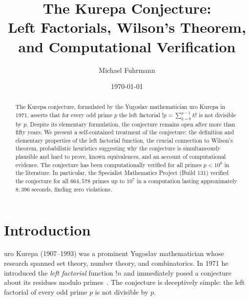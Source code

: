 \documentclass[12pt,a4paper]{amsart}
\theoremstyle{definition}
\begin{document}

\title{The Kurepa Conjecture:\\
       Left Factorials, Wilson's Theorem,\\
       and Computational Verification}

\author{Michael Fuhrmann}
\address{Specialist Mathematics Project, Build 133}
\date{\today}

\begin{abstract}
The Kurepa conjecture, formulated by the Yugoslav mathematician \DJ{}uro Kurepa
in 1971, asserts that for every odd prime $p$ the left factorial
$!p = \sum_{k=0}^{p-1} k!$ is not divisible by $p$.
Despite its elementary formulation, the conjecture remains open after more than
fifty years.
We present a self-contained treatment of the conjecture: the definition and
elementary properties of the left factorial function, the crucial connection to
Wilson's theorem, probabilistic heuristics suggesting why the conjecture is
simultaneously plausible and hard to prove, known equivalences, and an account
of computational evidence.
The conjecture has been computationally verified for all primes $p < 10^8$
in the literature.
In particular, the Specialist Mathematics Project (Build 131) verified the
conjecture for all $664{,}578$ primes up to $10^7$ in a computation lasting
approximately $8{,}396$ seconds, finding zero violations.
\end{abstract}

\maketitle
\tableofcontents

\section{Introduction}

\DJ{}uro Kurepa (1907--1993) was a prominent Yugoslav mathematician whose
research spanned set theory, number theory, and combinatorics.
In 1971 he introduced the \emph{left factorial} function $!n$ and immediately
posed a conjecture about its residues modulo primes~\cite{Kurepa1971}.
The conjecture is deceptively simple: the left factorial of every odd prime $p$
is not divisible by $p$.
\end{document}
